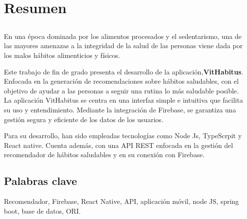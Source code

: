 \chapter*{Resumen}

\section*{\tituloPortadaVal}

En una época dominada por los alimentos procesados y el sedentarismo, una de las mayores amenazas a la integridad de la salud de las personas viene dada por los malos hábitos alimenticios y físicos.

Este trabajo de fin de grado presenta el desarrollo de la aplicación,\textbf{VitHabitus}. Enfocada en la generación de recomendaciones sobre hábitos saludables, con el objetivo de ayudar a las personas a seguir una rutina lo más saludable posible.\\

La aplicación VitHabitus se centra en una interfaz simple e intuitiva que facilita su uso y entendimiento. Mediante la integración de Firebase, se garantiza una gestión segura y eficiente de los datos de los usuarios. 

Para su desarrollo, han sido empleadas tecnologías como Node Js, TypeScrpit y React native.  Cuenta además, con una API REST enfocada en la gestión del recomendador de hábitos saludables y en su conexión con Firebase.

\section*{Palabras clave}
   
\noindent Recomendador, Firebase, React Native, API, aplicación móvil, node JS, spring boot, base de datos, ORI.

   


